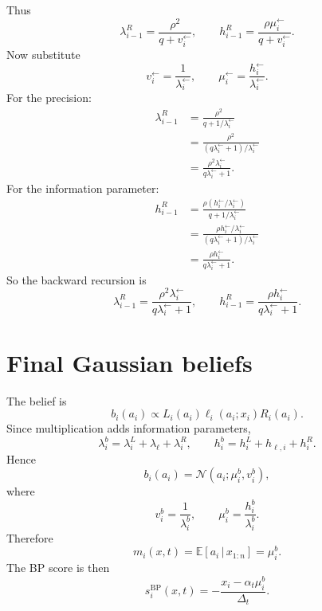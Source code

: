 \documentclass[11pt]{article}
\newcommand{\E}{\mathbb{E}}
\newcommand{\N}{\mathcal{N}}
\newcommand{\given}{\,|\,}
\begin{document}
Thus
\begin{equation}
  \lambda_{i-1}^R=\frac{\rho^2}{q+v_i^{\leftarrow}},
  \qquad
  h_{i-1}^R=\frac{\rho\mu_i^{\leftarrow}}{q+v_i^{\leftarrow}}.
\end{equation}
Now substitute
\[
  v_i^{\leftarrow}=\frac1{\lambda_i^{\leftarrow}},
  \qquad
  \mu_i^{\leftarrow}=\frac{h_i^{\leftarrow}}{\lambda_i^{\leftarrow}}.
\]
For the precision:
\begin{align}
  \lambda_{i-1}^R
  &=\frac{\rho^2}{q+1/\lambda_i^{\leftarrow}} \\
  &=\frac{\rho^2}{(q\lambda_i^{\leftarrow}+1)/\lambda_i^{\leftarrow}} \\
  &=\frac{\rho^2\lambda_i^{\leftarrow}}{q\lambda_i^{\leftarrow}+1}.
\end{align}
For the information parameter:
\begin{align}
  h_{i-1}^R
  &=\frac{\rho (h_i^{\leftarrow}/\lambda_i^{\leftarrow})}{q+1/\lambda_i^{\leftarrow}} \\
  &=\frac{\rho h_i^{\leftarrow}/\lambda_i^{\leftarrow}}{(q\lambda_i^{\leftarrow}+1)/\lambda_i^{\leftarrow}} \\
  &=\frac{\rho h_i^{\leftarrow}}{q\lambda_i^{\leftarrow}+1}.
\end{align}
So the backward recursion is
\begin{equation}
  \boxed{
  \lambda_{i-1}^R=\frac{\rho^2\lambda_i^{\leftarrow}}{q\lambda_i^{\leftarrow}+1},
  \qquad
  h_{i-1}^R=\frac{\rho h_i^{\leftarrow}}{q\lambda_i^{\leftarrow}+1}.
  }
\end{equation}

\section{Final Gaussian beliefs}

The belief is
\begin{equation}
  b_i(a_i)\propto L_i(a_i)\ell_i(a_i;x_i)R_i(a_i).
\end{equation}
Since multiplication adds information parameters,
\begin{equation}
  \lambda_i^b=\lambda_i^L+\lambda_\ell+\lambda_i^R,
  \qquad
  h_i^b=h_i^L+h_{\ell,i}+h_i^R.
\end{equation}
Hence
\begin{equation}
  b_i(a_i)=\N(a_i;\mu_i^b,v_i^b),
\end{equation}
where
\begin{equation}
  v_i^b=\frac1{\lambda_i^b},
  \qquad
  \mu_i^b=\frac{h_i^b}{\lambda_i^b}.
\end{equation}
Therefore
\begin{equation}
  m_i(x,t)=\E[a_i\given x_{1:n}]=\mu_i^b.
\end{equation}
The BP score is then
\begin{equation}
  s_i^{\mathrm{BP}}(x,t)
  =-\frac{x_i-\alpha_t\mu_i^b}{\Delta_t}.
\end{equation}
\end{document}

